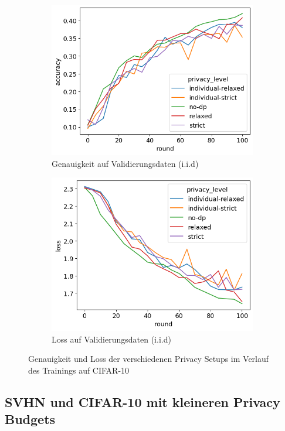 \begin{figure}[tb]
\begin{subfigure}{0.45\textwidth}
		\includegraphics[width=\textwidth]{Bilder/cifar10-accuracy-iid.png}
		\caption{Genauigkeit auf Validierungsdaten (i.i.d)}
	\end{subfigure}
	\begin{subfigure}{0.45\textwidth}
		\centering
		\includegraphics[width=\textwidth]{Bilder/cifar10-loss-iid.png}
		\caption{Loss auf Validierungsdaten (i.i.d)}
	\end{subfigure}
	\caption{Genauigkeit und Loss der verschiedenen Privacy Setups im Verlauf des Trainings auf CIFAR-10}
	\label{fig:fed-cifar10-results}
\end{figure}

\subsection{SVHN und CIFAR-10 mit kleineren Privacy Budgets}


